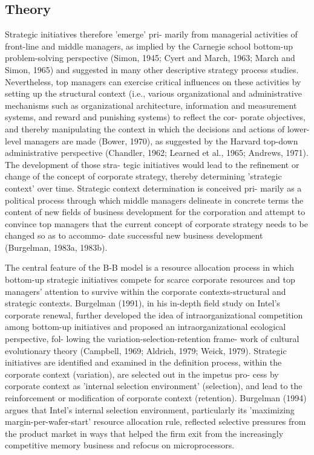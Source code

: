 \documentclass[12pt,letterpaper]{article}
\begin{document}
\subsection{Theory}
Strategic initiatives therefore 'emerge' pri- marily from managerial activities of front-line and middle managers, as implied by the Carnegie school bottom-up problem-solving perspective (Simon, 1945; Cyert and March, 1963; March and Simon, 1965) and suggested in many other descriptive strategy process studies. Nevertheless, top managers can exercise critical influences on these activities by setting up the structural context (i.e., various organizational and administrative mechanisms such as organizational architecture, information and measurement systems, and reward and punishing systems) to reflect the cor- porate objectives, and thereby manipulating the context in which the decisions and actions of lower-level managers are made (Bower, 1970), as suggested by the Harvard top-down administrative perspective (Chandler, 1962; Learned et al., 1965; Andrews, 1971). The development of those stra- tegic initiatives would lead to the refinement or change of the concept of corporate strategy, thereby determining 'strategic context' over time. Strategic context determination is conceived pri- marily as a political process through which middle managers delineate in concrete terms the content of new fields of business development for the corporation and attempt to convince top managers that the current concept of corporate strategy needs to be changed so as to accommo- date successful new business development (Burgelman, 1983a, 1983b).

The central feature of the B-B model is a resource allocation process in which bottom-up strategic initiatives compete for scarce corporate resources and top managers' attention to survive within the corporate contexts-structural and strategic contexts. Burgelman (1991), in his in-depth field study on Intel's corporate renewal, further developed the idea of intraorganizational competition among bottom-up initiatives and proposed an intraorganizational ecological perspective, fol- lowing the variation-selection-retention frame- work of cultural evolutionary theory (Campbell, 1969; Aldrich, 1979; Weick, 1979). Strategic initiatives are identified and examined in the definition process, within the corporate context (variation), are selected out in the impetus pro- cess by corporate context as 'internal selection environment' (selection), and lead to the reinforcement or modification of corporate context (retention). Burgelman (1994) argues that Intel's internal selection environment, particularly its 'maximizing margin-per-wafer-start' resource allocation rule, reflected selective pressures from the product market in ways that helped the firm exit from the increasingly competitive memory business and refocus on microprocessors.
\end{document}
